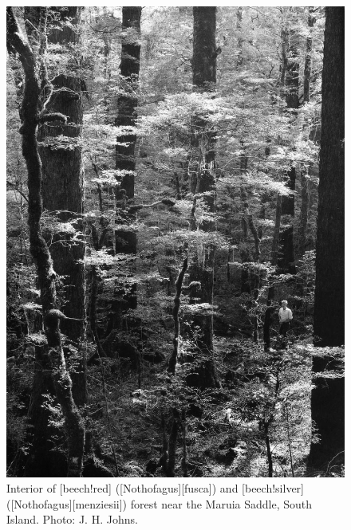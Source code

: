 \begin{figure}[t]
\begin{minipage}[t]{\textwidth}
\begin{minipage}[t]{(\textwidth-\fgap) * \real{0.499}}
			\includegraphics[width=\textwidth]{graphics/figure72beech.jpg}
			\caption[Interior of red beech and silver beech forest]{Interior of [beech!red] ([Nothofagus][fusca]) and [beech!silver] ([Nothofagus][menziesii]) forest near the Maruia Saddle, South Island.
			Photo: J. H. Johns.}%
			\label{fig:72beech}
		\end{minipage}
	\end{minipage}
\end{figure}

